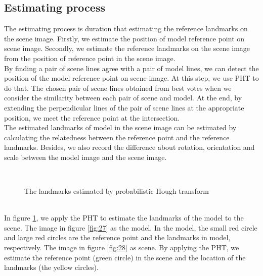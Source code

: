 \subsection{Estimating process}
The estimating process is duration that estimating the reference landmarks on the scene image. Firstly, we estimate the position of model reference point on scene image. Secondly, we estimate the reference landmarks on the scene image from the position of reference point in the scene image.\\[0.2cm]
By finding a pair of scene lines agree with a pair of model lines, we can detect the position of the model reference point on scene image. At this step, we use PHT to do that. The chosen pair of scene lines obtained from best votes when we consider the similarity between each pair of scene and model. At the end, by extending the perpendicular lines of the pair of scene lines at the appropriate position, we meet the reference point at the intersection.\\[0.2cm]
The estimated landmarks of model in the scene image can be estimated by calculating the relatedness between the reference point and the reference landmarks. Besides, we also record the difference about rotation, orientation and scale between the model image and the scene image.
\begin{figure}[h!]
\centering
{}~~
\caption{The landmarks estimated by probabilistic Hough transform}
\label{fig:42}
\end{figure}~\\
In figure \ref{fig:42}, we apply the PHT to estimate the landmarks of the model to the scene. The image in figure \ref{fig:27} as the model. In the model, the small red circle and large red circles are the reference point and the landmarks in model, respectively. The image in figure \ref{fig:28} as scene. By applying the PHT, we estimate the reference point (green circle) in the scene and the location of the landmarks (the yellow circles).
